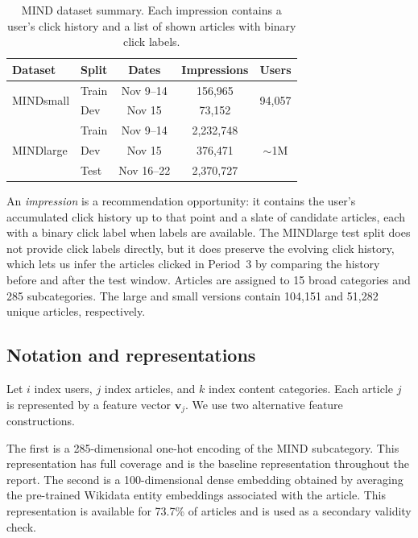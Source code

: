 \documentclass[11pt]{article}
\begin{document}
\begin{table}[ht]
\centering
\caption{MIND dataset summary. Each impression contains a user's click history and a list of shown articles with binary click labels.}
\label{tab:datasets}
\begin{tabular}{llccc}
\toprule
Dataset & Split & Dates & Impressions & Users \\
\midrule
\multirow{2}{*}{MINDsmall} & Train & Nov 9--14 & 156,965 & \multirow{2}{*}{94,057} \\
 & Dev & Nov 15 & 73,152 & \\
\midrule
\multirow{3}{*}{MINDlarge} & Train & Nov 9--14 & 2,232,748 & \multirow{3}{*}{${\sim}$1M} \\
 & Dev & Nov 15 & 376,471 & \\
 & Test & Nov 16--22 & 2,370,727 & \\
\bottomrule
\end{tabular}
\end{table}
\FloatBarrier

An \emph{impression} is a recommendation opportunity: it contains the user's accumulated click history up to that point and a slate of candidate articles, each with a binary click label when labels are available. The MINDlarge test split does not provide click labels directly, but it does preserve the evolving click history, which lets us infer the articles clicked in Period~3 by comparing the history before and after the test window. Articles are assigned to 15 broad categories and 285 subcategories. The large and small versions contain 104,151 and 51,282 unique articles, respectively.

\subsection{Notation and representations}
\label{sec:notation}

Let $i$ index users, $j$ index articles, and $k$ index content categories. Each article $j$ is represented by a feature vector $\mathbf{v}_j$. We use two alternative feature constructions.

The first is a 285-dimensional one-hot encoding of the MIND subcategory. This representation has full coverage and is the baseline representation throughout the report. The second is a 100-dimensional dense embedding obtained by averaging the pre-trained Wikidata entity embeddings associated with the article. This representation is available for 73.7\% of articles and is used as a secondary validity check.
\end{document}
